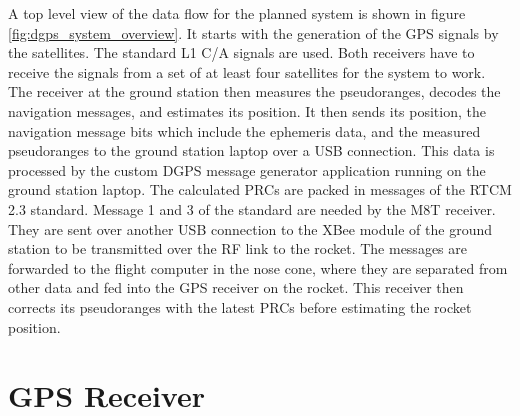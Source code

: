 A top level view of the data flow for the planned system is shown in figure \ref{fig:dgps_system_overview}.
It starts with the generation of the GPS signals by the satellites.
The standard L1 C/A signals are used.
Both receivers have to receive the signals from a set of at least four satellites for the system to work.
The receiver at the ground station then measures the pseudoranges, decodes the navigation messages, and estimates its position.
It then sends its position, the navigation message bits which include the ephemeris data, and the measured pseudoranges to the ground station laptop over a USB connection.
This data is processed by the custom DGPS message generator application running on the ground station laptop.
The calculated PRCs are packed in messages of the RTCM 2.3 standard.
Message 1 and 3 of the standard are needed by the M8T receiver.
They are sent over another USB connection to the XBee module of the ground station to be transmitted over the RF link to the rocket.
The messages are forwarded to the flight computer in the nose cone, where they are separated from other data and fed into the GPS receiver on the rocket.
This receiver then corrects its pseudoranges with the latest PRCs before estimating the rocket position.


\section{GPS Receiver}\label{sec:receiver}

